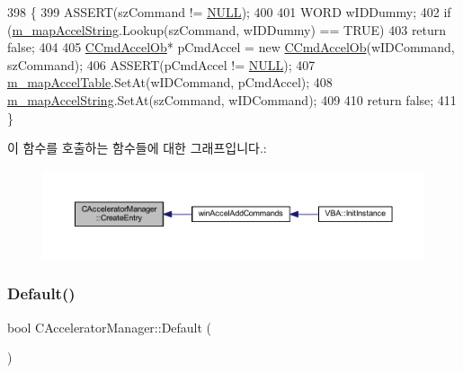 \begin{DoxyCode}
398 \{
399   ASSERT(szCommand != \mbox{\hyperlink{getopt1_8c_a070d2ce7b6bb7e5c05602aa8c308d0c4}{NULL}});
400 
401   WORD wIDDummy;
402   \textcolor{keywordflow}{if} (\mbox{\hyperlink{class_c_accelerator_manager_abb40dbb1a44c47ac22590e8f1243835b}{m\_mapAccelString}}.Lookup(szCommand, wIDDummy) == TRUE)
403     \textcolor{keywordflow}{return} \textcolor{keyword}{false};
404 
405   \mbox{\hyperlink{class_c_cmd_accel_ob}{CCmdAccelOb}}* pCmdAccel = \textcolor{keyword}{new} \mbox{\hyperlink{class_c_cmd_accel_ob}{CCmdAccelOb}}(wIDCommand, szCommand);
406   ASSERT(pCmdAccel != \mbox{\hyperlink{getopt1_8c_a070d2ce7b6bb7e5c05602aa8c308d0c4}{NULL}});
407   \mbox{\hyperlink{class_c_accelerator_manager_a16b8d3e9328bc0eeeb048630deff2768}{m\_mapAccelTable}}.SetAt(wIDCommand, pCmdAccel);
408   \mbox{\hyperlink{class_c_accelerator_manager_abb40dbb1a44c47ac22590e8f1243835b}{m\_mapAccelString}}.SetAt(szCommand, wIDCommand);
409 
410   \textcolor{keywordflow}{return} \textcolor{keyword}{false};
411 \}
\end{DoxyCode}
이 함수를 호출하는 함수들에 대한 그래프입니다.\+:
\nopagebreak
\begin{figure}[H]
\begin{center}
\leavevmode
\includegraphics[width=350pt]{class_c_accelerator_manager_ab534c2d8c0d7d7e30c5e907677bfad68_icgraph}
\end{center}
\end{figure}
\mbox{\label{class_c_accelerator_manager_aa510a36964ed209de5f7325efa713bf6}} 
\subsubsection{\texorpdfstring{Default()}{Default()}}
{\footnotesize\ttfamily bool C\+Accelerator\+Manager\+::\+Default (\begin{DoxyParamCaption}{ }\end{DoxyParamCaption})}



